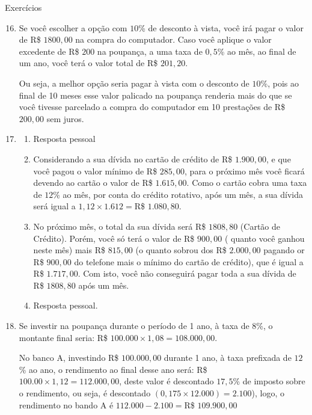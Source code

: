 \begin{answer}{Exercícios}
{\exerciselist

  \begin{enumerate}\setcounter{enumi}{15}
    \item Se você escolher a opção com $10$\% de desconto à vista, você irá pagar o valor de R\$ $1800{,}00$ na compra do computador. Caso você aplique o valor excedente de R\$ $200$ na poupança, a uma taxa de $0{,}5$\% ao mês, ao final de um ano, você terá o valor total de R\$ $201{,}20$.

    Ou seja, a melhor opção seria pagar à vista com o desconto de $10$\%, pois ao final de 10 meses esse valor palicado na poupança renderia mais do que se você tivesse parcelado a compra do computador em 10 prestações de R\$ $200{,}00$ sem juros.

    \item
    \begin{enumerate}
      \item Resposta pessoal
      \item Considerando a sua dívida no cartão de crédito de R\$ $1.900{,}00$, e que você pagou o valor mínimo de R\$ $285{,}00$, para o próximo mês você ficará devendo ao cartão o valor de R\$ $1.615{,}00$. Como o cartão cobra uma taxa de $12$\% ao mês, por conta do crédito rotativo, após um mês, a sua dívida será igual a $1{,}12\times1.612=$R\$ $1.080{,}80$.
      \item No próximo mês, o total da sua dívida será R\$ $1808{,}80$ (Cartão de Crédito). Porém, você só terá o valor de R\$ $900{,}00$ ( quanto você ganhou neste mês) mais R\$ $815{,}00$ (o quanto sobrou dos R\$ $2.000{,}00$ pagando or R\$ $900,00$ do telefone mais o mínimo do cartão de crédito), que é igual a R\$ $1.717{,}00$. Com isto, você não conseguirá pagar toda a sua dívida de R\$ $1808{,}80$ após um mês.
      \item Resposta pessoal.
    \end{enumerate}
    \item Se investir na poupança durante o período de 1 ano, à taxa de $8$\%, o montante final seria: R\$ $100.000\times1{,}08=108.000{,}00$.

    No banco A, investindo R\$ $100.000{,}00$ durante 1 ano, à taxa prefixada de $12$\% ao ano, o rendimento ao final desse ano será: R\$ $100.00\times1{,}12=112.000{,}00$, deste valor é descontado $17{,}5$\% de imposto sobre o rendimento, ou seja, é descontado $(0{,}175\times12.000)=2.100$), logo, o rendimento no bando A é $112.000-2.100=$R\$ $109.900{,}00$


\end{enumerate}}
\end{answer}
